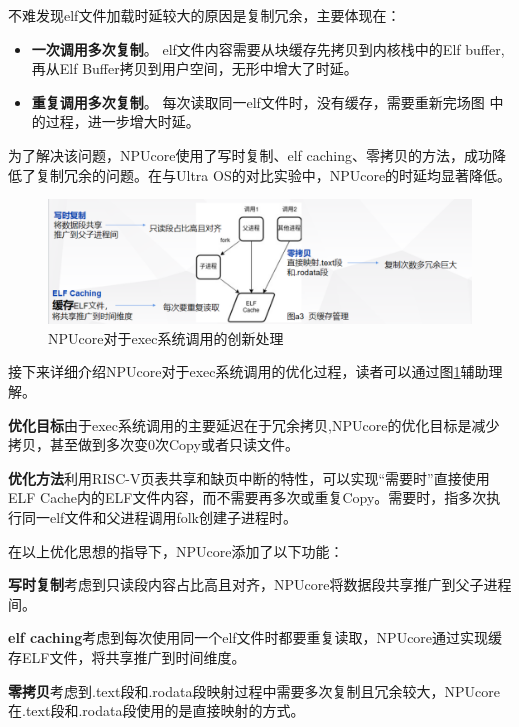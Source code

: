 不难发现elf文件加载时延较大的原因是复制冗余，主要体现在：
\begin{itemize}
	\item \textbf{一次调用多次复制}。 elf文件内容需要从块缓存先拷贝到内核栈中的Elf buffer,再从Elf Buffer拷贝到用户空间，无形中增大了时延。
	
	\item \textbf{重复调用多次复制}。 每次读取同一elf文件时，没有缓存，需要重新完场图 中的过程，进一步增大时延。
\end{itemize}

为了解决该问题，NPUcore使用了写时复制、elf caching、零拷贝的方法，成功降低了复制冗余的问题。在与Ultra OS的对比实验中，NPUcore的时延均显著降低。

\begin{figure}[htbp]
	\centering
	\includegraphics[scale=0.5]{figures/10-04/10-04-03.png}
	\caption{NPUcore对于exec系统调用的创新处理}
	\label{exam-3}
\end{figure}

接下来详细介绍NPUcore对于exec系统调用的优化过程，读者可以通过图\ref{exam-3}辅助理解。

\textbf{优化目标}\;由于exec系统调用的主要延迟在于冗余拷贝,NPUcore的优化目标是减少拷贝，甚至做到多次变0次Copy或者只读文件。

\textbf{优化方法}\;利用RISC-V页表共享和缺页中断的特性，可以实现“需要时”直接使用ELF Cache内的ELF文件内容，而不需要再多次或重复Copy。需要时，指多次执行同一elf文件和父进程调用folk创建子进程时。

在以上优化思想的指导下，NPUcore添加了以下功能：

\textbf{写时复制}\;考虑到只读段内容占比高且对齐，NPUcore将数据段共享推广到父子进程间。

\textbf{elf caching}\;考虑到每次使用同一个elf文件时都要重复读取，NPUcore通过实现缓存ELF文件，将共享推广到时间维度。

\textbf{零拷贝}\;考虑到.text段和.rodata段映射过程中需要多次复制且冗余较大，NPUcore在.text段和.rodata段使用的是直接映射的方式。

